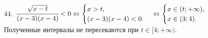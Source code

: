 44. $\cfrac{\sqrt{x-t}}{(x-3)(x-4)}<0\Leftrightarrow \begin{cases}x>t,\\(x-3)(x-4)<0.\end{cases}
\Leftrightarrow \begin{cases}x\in(t;+\infty),\\ x\in(3;4).\end{cases}$ Полученные интервалы не пересекаются при $t\in[4;+\infty).$\\
